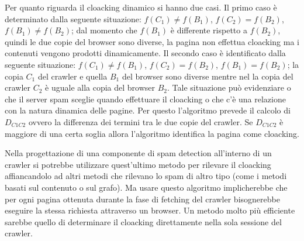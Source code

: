 Per quanto riguarda il cloacking dinamico si hanno due casi. Il primo caso è determinato dalla seguente situazione: \(f(C_1)\not=f(B_1)\), \(f(C_2)=f(B_2)\), \(f(B_1)\not=f(B_2)\); dal momento che \(f(B_1)\) è differente rispetto a \(f(B_2)\), quindi le due copie del browser sono diverse,  la pagina non effettua cloacking ma i contenuti vengono prodotti dinamicamente. Il secondo caso è identificato dalla seguente situazione: \(f(C_1)\not=f(B_1)\), \(f(C_2)=f(B_2)\), \(f(B_1)=f(B_2)\); la copia \(C_1\) del crawler e quella \(B_1\) del browser sono diverse mentre nel  la copia del crawler \(C_2\) è uguale alla copia del browser \(B_2\). Tale situazione può evidenziare o che il server spam sceglie quando effettuare il cloacking o che c'è una relazione con la natura dinamica delle pagine. Per questo l'algoritmo prevede il calcolo di \(D_{C1C2}\) ovvero la differenza dei termini tra le due copie del crawler. Se \(D_{C1C2}\) è maggiore di una certa soglia allora l'algoritmo identifica la pagina come cloacking.

Nella progettazione di una componente di spam detection all'interno di un crawler si potrebbe utilizzare quest'ultimo metodo per rilevare il cloacking affiancandolo ad altri metodi che rilevano lo spam di altro tipo (come i metodi basati sul contenuto o sul grafo). Ma usare questo algoritmo  implicherebbe che per ogni pagina ottenuta durante la fase di fetching del crawler bisognerebbe eseguire la stessa richiesta attraverso un browser. Un metodo molto più efficiente sarebbe quello di determinare il cloacking direttamente nella sola sessione del crawler.

